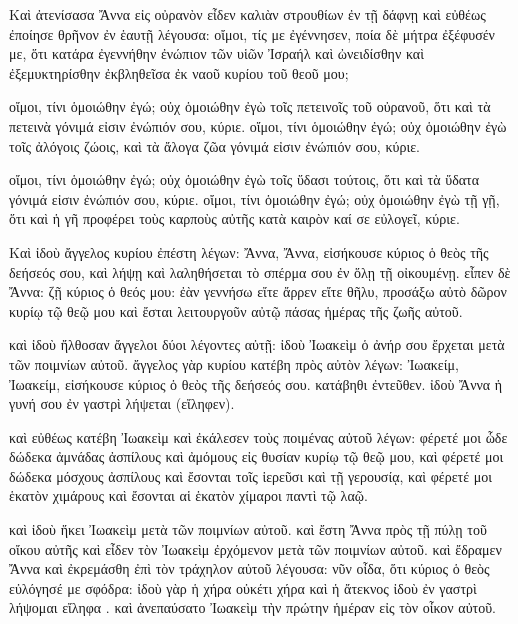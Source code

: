 \pend\pstart
{}

\pend\setcounter{pstartL}{1}\pstart
Καὶ ἀτενίσασα Ἄννα εἰς οὐρανὸν εἶδεν καλιὰν στρουθίων ἐν τῇ δάφνῃ καὶ εὐθέως ἐποίησε θρῆνον ἐν ἑαυτῇ λέγουσα: οἴμοι, τίς με ἐγέννησεν, ποία δὲ μήτρα ἐξέφυσέν με, ὅτι κατάρα ἐγεννήθην ἐνώπιον τῶν υἱῶν Ἰσραήλ καὶ ὠνειδίσθην καὶ ἐξεμυκτηρίσθην ἐκβληθεῖσα ἐκ ναοῦ κυρίου τοῦ θεοῦ μου;

\pend\pstart
οἴμοι, τίνι ὁμοιώθην ἐγώ; οὐχ ὁμοιώθην ἐγὼ τοῖς πετεινοῖς τοῦ οὐρανοῦ, ὅτι καὶ τὰ πετεινὰ γόνιμά εἰσιν ἐνώπιόν σου, κύριε. οἴμοι, τίνι ὁμοιώθην ἐγώ; οὐχ ὁμοιώθην ἐγὼ τοῖς ἀλόγοις ζώοις, καὶ τὰ ἄλογα ζῶα γόνιμά εἰσιν ἐνώπιόν σου, κύριε.

\pend\pstart
οἴμοι, τίνι ὁμοιώθην ἐγώ; οὐχ ὁμοιώθην ἐγὼ τοῖς ὕδασι τούτοις, ὅτι καὶ τὰ ὕδατα γόνιμά εἰσιν ἐνώπιόν σου, κύριε. οἴμοι, τίνι ὁμοιώθην ἐγώ; οὐχ ὁμοιώθην ἐγὼ τῇ γῇ, ὅτι καὶ ἡ γῆ προφέρει τοὺς καρποὺς αὐτῆς κατὰ καιρὸν καί σε εὐλογεῖ, κύριε.

\pend\pstart
{}

\pend\setcounter{pstartL}{1}\pstart
Καὶ ἰδοὺ ἄγγελος κυρίου ἐπέστη λέγων: Ἄννα, Ἄννα, εἰσήκουσε κύριος ὁ θεὸς τῆς δεήσεός σου, καὶ λήψῃ καὶ λαληθήσεται τὸ σπέρμα σου ἐν ὅλῃ τῇ οἰκουμένῃ. εἶπεν δὲ Ἄννα: ζῇ κύριος ὁ θεός μου: ἐὰν γεννήσω εἴτε ἄρρεν εἴτε θῆλυ, προσάξω αὐτὸ δῶρον κυρίῳ τῷ θεῷ μου καὶ ἔσται λειτουργοῦν αὐτῷ πάσας ἡμέρας τῆς ζωῆς αὐτοῦ.

\pend\pstart
καὶ ἰδοὺ ἤλθοσαν ἄγγελοι δύοι λέγοντες αὐτῇ: ἰδοὺ Ἰωακεὶμ ὁ ἀνήρ σου ἔρχεται μετὰ τῶν ποιμνίων αὐτοῦ. ἄγγελος γὰρ κυρίου κατέβη πρὸς αὐτὸν λέγων: Ἰωακείμ, Ἰωακείμ, εἰσήκουσε κύριος ὁ θεὸς τῆς δεήσεός σου. κατάβηθι ἐντεῦθεν. ἰδοὺ Ἄννα ἡ γυνή σου ἐν γαστρὶ λήψεται (εἴληφεν).

\pend\pstart
καὶ εὐθέως κατέβη Ἰωακεὶμ καὶ ἐκάλεσεν τοὺς ποιμένας αὐτοῦ λέγων: φέρετέ μοι ὧδε δώδεκα ἀμνάδας ἀσπίλους καὶ ἀμόμους εἰς θυσίαν κυρίῳ τῷ θεῷ μου, καὶ φέρετέ μοι δώδεκα μόσχους ἀσπίλους καὶ ἔσονται τοῖς ἱερεῦσι καὶ τῇ γερουσίᾳ, καὶ φέρετέ μοι ἑκατὸν χιμάρους καὶ ἔσονται αἱ ἑκατὸν χίμαροι παντὶ τῷ λαῷ.

\pend\pstart
καὶ ἰδοὺ ἥκει Ἰωακεὶμ μετὰ τῶν ποιμνίων αὐτοῦ. καὶ ἔστη Ἄννα πρὸς τῇ πύλῃ τοῦ οἴκου αὐτῆς καὶ εἶδεν τὸν Ἰωακεὶμ ἐρχόμενον μετὰ τῶν ποιμνίων αὐτοῦ. καὶ ἔδραμεν Ἄννα καὶ ἐκρεμάσθη ἐπὶ τὸν τράχηλον αὐτοῦ λέγουσα: νῦν οἶδα, ὅτι κύριος ὁ θεὸς εὐλόγησέ με σφόδρα: ἰδοὺ γὰρ ἡ χήρα οὐκέτι χήρα καὶ ἡ ἄτεκνος ἰδοὺ ἐν γαστρὶ λήψομαι εἴληφα . καὶ ἀνεπαύσατο Ἰωακεὶμ τὴν πρώτην ἡμέραν εἰς τὸν οἶκον αὐτοῦ.

